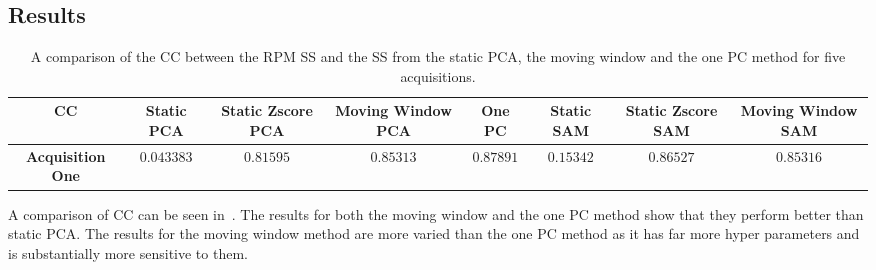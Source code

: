         \subsection{Results} \label{sec:pca_data_driven_surrogate_signal_extraction_methods_for_dynamic_pet_results}
            \begin{table}
                \centering
                
                \captionsetup{singlelinecheck=false, justification=centering}
                \caption{A comparison of the \gls{CC} between the \gls{RPM} \gls{SS} and the \gls{SS} from the static \gls{PCA}, the moving window and the one \gls{PC} method for five acquisitions.}
                
                \resizebox*{1.0\linewidth}{!}
                {
                    \begin{tabular}{||c|ccccccc||}
                        \hline
                        \textbf{\gls{CC}} & \textbf{Static \gls{PCA}} & \textbf{Static Zscore \gls{PCA}} & \textbf{Moving Window \gls{PCA}} & \textbf{One \gls{PC}} & \textbf{Static \gls{SAM}} & \textbf{Static Zscore \gls{SAM}} & \textbf{Moving Window \gls{SAM}} \\
                        \hline
                        \textbf{Acquisition One} & $0.043383$ & $0.81595$ & $0.85313$ & $0.87891$ & $0.15342$ & $0.86527$ & $0.85316$ \\
                        \hline
                    \end{tabular}
                }
                \label{tab:pca_data_driven_surrogate_signal_extraction_methods_for_dynamic_pet_results_cross_correlation}
            \end{table}
            
            A comparison of \gls{CC} can be seen in~. The results for both the moving window and the one \gls{PC} method show that they perform better than static \gls{PCA}. The results for the moving window method are more varied than the one \gls{PC} method as it has far more hyper parameters and is substantially more sensitive to them.
            
